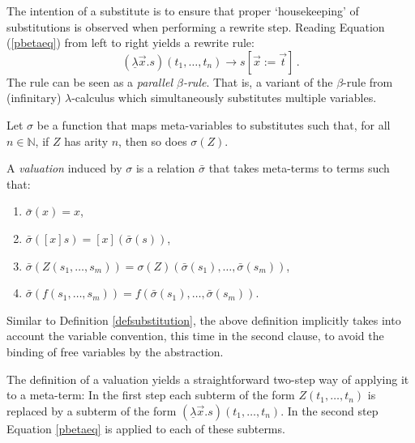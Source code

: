 \documentclass{LMCS}
\theoremstyle{plain}
\theoremstyle{definition}
\newcommand{\rew}{\rightarrow}
\newcommand{\ulam}{\underline{\lambda}}
\begin{document}
The intention of a substitute is to ensure that proper `housekeeping' 
of substitutions is observed when performing a rewrite step. Reading Equation (\ref{pbetaeq}) from left to right yields a rewrite rule:
\[
(\ulam \vec{x}. s)(t_1, \ldots, t_n) \rew s[\vec{x} := \vec{t}] \, .
\]
The rule can be seen as a \emph{parallel $\beta$-rule}. That is, a variant of the $\beta$-rule from (infinitary) $\lambda$-calculus which simultaneously substitutes multiple variables.

\begin{defi}
\label{defvaluation}
Let $\sigma$ be a function that maps meta-variables to substitutes
such that, for all $n \in \mathbb{N}$, if $Z$ has arity $n$, then so
does $\sigma(Z)$.

A \emph{valuation} induced by $\sigma$ is a relation $\bar{\sigma}$ that takes meta-terms to terms such that:
\begin{enumerate}[(1)]
\item
$\bar{\sigma}(x) = x$,
\item
$\bar{\sigma}([x]s) = [x](\bar{\sigma}(s))$,
\item
$\bar{\sigma}(Z(s_1, \ldots, s_m)) = \sigma(Z)(\bar{\sigma}(s_1), \ldots, \bar{\sigma}(s_m))$,
\item
$\bar{\sigma}(f(s_1, \ldots, s_m)) = f(\bar{\sigma}(s_1), \ldots, \bar{\sigma}(s_m))$.
\end{enumerate}

\end{defi}

Similar to Definition \ref{defsubstitution}, the above definition implicitly takes into account the variable convention, this time in the second clause, to avoid the binding of free variables by the abstraction.

The definition of a valuation yields a straightforward two-step way of applying it to a meta-term: In the first step each subterm of the form $Z(t_1, \ldots, t_n)$ is replaced by a subterm of the form $(\ulam \vec{x}. s)(t_1, \ldots, t_n)$. In the second step Equation \eqref{pbetaeq} is applied to each of these subterms.
\end{document}
